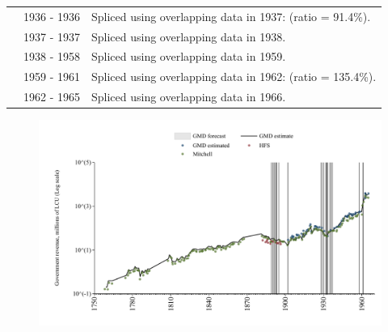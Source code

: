\documentclass[12pt,a4paper,landscape]{article}
\begin{document}
\begin{adjustbox}{max totalsize={\paperwidth}{\paperheight},center}
\begin{minipage}[t][\textheight][t]{\textwidth}
\begin{table}[H]
\begin{tabular}{|l|l|l|}
\rowcolor{lightgray}\cite{GMD_estimated}& 1936 - 1936 &Spliced using overlapping data in 1937: (ratio = 91.4\%). \\
\rowcolor{white}\cite{Mitchell}& 1937 - 1937 &Spliced using overlapping data in 1938. \\
\rowcolor{lightgray}\cite{GMD_estimated}& 1938 - 1958 &Spliced using overlapping data in 1959. \\
\rowcolor{white}\cite{Mitchell}& 1959 - 1961 &Spliced using overlapping data in 1962: (ratio = 135.4\%). \\
\rowcolor{lightgray}\cite{GMD_estimated}& 1962 - 1965 &Spliced using overlapping data in 1966. \\
\hline
\end{tabular}
\end{table}
\begin{figure}[H]
\centering
\includegraphics[width=\textwidth,height=0.6\textheight,keepaspectratio]{graphs/CUB_govrev.pdf}
\end{figure}
\end{minipage}
\end{adjustbox}
\end{document}
